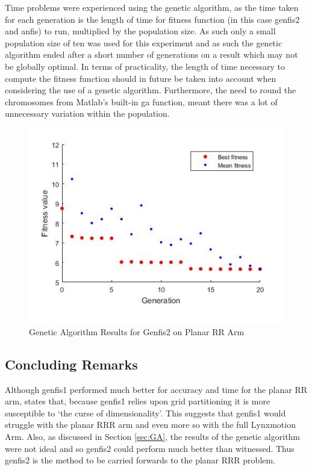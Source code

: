 \documentclass[11.5pt, twoside, a4paper]{article}
\begin{document}
Time problems were experienced using the genetic algorithm, as the time taken for each generation is the length of time for fitness function (in this case genfis2 and anfis) to run, multiplied by the population size. As such only a small population size of ten was used for this experiment and as such the genetic algorithm ended after a short number of generations on a result which may not be globally optimal. In terms of practicality, the length of time necessary to compute the fitness function should in future be taken into account when considering the use of a genetic algorithm. Furthermore, the need to round the chromosomes from Matlab's built-in ga function, meant there was a lot of unnecessary variation within the population.

\begin{figure}
\begin{center}
\includegraphics[width=\linewidth]{GAResults.jpg}
\caption{Genetic Algorithm Results for Genfis2 on Planar RR Arm\label{fig:GA}}
\end{center}
\end{figure}

\subsection{Concluding Remarks}
Although genfis1 performed much better for accuracy and time for the planar RR arm, \cite{faq} states that, because genfis1 relies upon grid partitioning it is more susceptible to `the curse of dimensionality'. This suggests that genfis1 would struggle with the planar RRR arm and even more so with the full Lynxmotion Arm. Also, as discussed in Section \ref{sec:GA}, the results of the genetic algorithm were not ideal and so genfis2 could perform much better than witnessed. Thus genfis2 is the method to be carried forwards to the planar RRR problem. 
\end{document}
